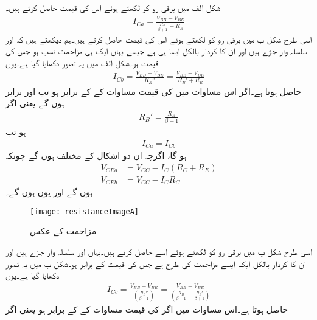 شکل  الف میں برقی رو کو   لکھتے ہوئے اس کی قیمت حاصل کرتے ہیں۔
\begin{align} \label{مساوات_ٹرانزسٹر_خارجی_رو_الف}
I_{Ca}=\frac{V_{BB}-V_{BE}}{\frac{R_B}{\beta+1}+R_E}
\end{align}
اسی طرح شکل  ب میں برقی رو کو   لکھتے ہوئے اس کی قیمت حاصل کرتے ہیں۔ہم دیکھتے ہیں کہ  اور  سلسلہ وار جڑے ہیں اور ان کا کردار بالکل ایسا ہی ہے جیسے یہاں ایک ہی مزاحمت   نسب ہو جس کی قیمت ہو۔شکل  الف میں یہ تصور دکھایا گیا ہے۔یوں
\begin{align} \label{مساوات_ٹرانزسٹر_خارجی_رو_ب}
I_{Cb}=\frac{V_{BB}-V_{BE}}{R_E''}=\frac{V_{BB}-V_{BE}}{R_B'+R_E}
\end{align}
حاصل ہوتا ہے۔اگر اس مساوات میں  کی قیمت  مساوات   کے  کے برابر ہو تب  اور   برابر ہوں گے یعنی اگر
\begin{align} \label{مساوات_ٹرانزسٹر_قابو_مزاحمت_کا_عکس}
R_B'=\frac{R_B}{\beta+1}
\end{align}
ہو تب
\begin{align}
I_{Ca}=I_{Cb}
\end{align}
ہو گا، اگرچہ ان دو اشکال کے   مختلف ہوں گے چونکہ
\begin{align*}
V_{CEa}&=V_{CC}-I_C \left (R_C+R_E \right )\\
V_{CEb}&=V_{CC}-I_C R_C
\end{align*}
ہوں گے اور یوں   ہوں گے۔
\begin{figure}
\centering
\texttt{[image: resistanceImageA]}
\caption{مزاحمت کے عکس}
\label{شکل_مزاحمت_کا_عکس}
\end{figure}
اسی طرح شکل  پ میں برقی رو کو  لکھتے ہوئے اسے حاصل کرتے ہیں۔یہاں   اور  سلسلہ وار جڑے ہیں اور ان کا کردار بالکل ایک ایسے مزاحمت    کی طرح ہے جس کی قیمت  کے برابر ہو۔شکل  ب میں یہ تصور دکھایا گیا ہے۔یوں
\begin{align}
I_{Cc}=\frac{V_{BB}-V_{BE}}{\left (\frac{R_B''}{\beta+1} \right )}=\frac{V_{BB}-V_{BE}}{\left (\frac{R_B}{\beta+1}+\frac{R_E'}{\beta+1} \right )}
\end{align}
حاصل ہوتا ہے۔اس مساوات میں اگر   کی قیمت مساوات   کے   کے برابر ہو یعنی اگر
